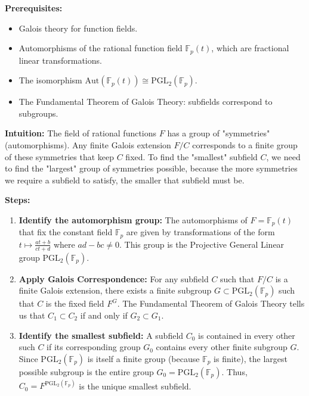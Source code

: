 \begin{solution}
\textbf{Prerequisites:}
\begin{itemize}
    \item Galois theory for function fields.
    \item Automorphisms of the rational function field $\mathbb{F}_p(t)$, which are fractional linear transformations.
    \item The isomorphism $\mathrm{Aut}(\mathbb{F}_p(t)) \cong \mathrm{PGL}_2(\mathbb{F}_p)$.
    \item The Fundamental Theorem of Galois Theory: subfields correspond to subgroups.
\end{itemize}

\textbf{Intuition:}
The field of rational functions $F$ has a group of "symmetries" (automorphisms). Any finite Galois extension $F/C$ corresponds to a finite group of these symmetries that keep $C$ fixed. To find the "smallest" subfield $C$, we need to find the "largest" group of symmetries possible, because the more symmetries we require a subfield to satisfy, the smaller that subfield must be.

\par

\textbf{Steps:}
\begin{enumerate}
    \item \textbf{Identify the automorphism group:} The automorphisms of $F = \mathbb{F}_p(t)$ that fix the constant field $\mathbb{F}_p$ are given by transformations of the form $t \mapsto \frac{at+b}{ct+d}$ where $ad-bc \neq 0$. This group is the Projective General Linear group $\mathrm{PGL}_2(\mathbb{F}_p)$.

    \item \textbf{Apply Galois Correspondence:} For any subfield $C$ such that $F/C$ is a finite Galois extension, there exists a finite subgroup $G \subset \mathrm{PGL}_2(\mathbb{F}_p)$ such that $C$ is the fixed field $F^G$. The Fundamental Theorem of Galois Theory tells us that $C_1 \subset C_2$ if and only if $G_2 \subset G_1$.

    \item \textbf{Identify the smallest subfield:} A subfield $C_0$ is contained in every other such $C$ if its corresponding group $G_0$ contains every other finite subgroup $G$. Since $\mathrm{PGL}_2(\mathbb{F}_p)$ is itself a finite group (because $\mathbb{F}_p$ is finite), the largest possible subgroup is the entire group $G_0 = \mathrm{PGL}_2(\mathbb{F}_p)$. Thus, $C_0 = F^{\mathrm{PGL}_2(\mathbb{F}_p)}$ is the unique smallest subfield.


\end{enumerate}
\end{solution}
